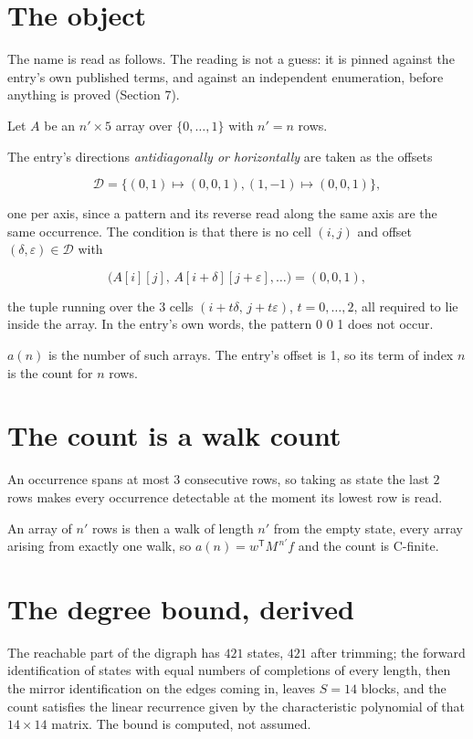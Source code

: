 \documentclass[11pt]{article}
\theoremstyle{definition}
\begin{document}
\section{The object}

The name is read as follows. The reading is not a guess: it is pinned against the entry's own published terms, and against an independent enumeration, before anything is proved (Section 7).

Let $A$ be an $n' \times 5$ array over $\{0,\dots,1\}$ with $n' = n$ rows.

The entry's directions {\itshape antidiagonally or horizontally} are taken as the offsets

\[\mathcal{D} = \{(0,1)\mapsto(0,0,1), (1,-1)\mapsto(0,0,1)\},\]

one per axis, since a pattern and its reverse read along the same axis are the same occurrence. The condition is that there is no cell $(i,j)$ and offset $(\delta,\varepsilon)\in\mathcal{D}$ with

\[\bigl(A[i][j],\,A[i{+}\delta][j{+}\varepsilon],\dots\bigr) = (0, 0, 1),\]

the tuple running over the $3$ cells $(i+t\delta,\,j+t\varepsilon)$, $t = 0,\dots,2$, all required to lie inside the array. In the entry's own words, the pattern 0 0 1 does not occur.

$a(n)$ is the number of such arrays. The entry's offset is 1, so its term of index $n$ is the count for $n$ rows.

\section{The count is a walk count}

An occurrence spans at most $3$ consecutive rows, so taking as state the last $2$ rows makes every occurrence detectable at the moment its lowest row is read.

An array of $n'$ rows is then a walk of length $n'$ from the empty state, every array arising from exactly one walk, so $a(n) = w^{\mathsf T}M^{\,n'}f$ and the count is C-finite.

\section{The degree bound, derived}

The reachable part of the digraph has $421$ states, $421$ after trimming; the forward identification of states with equal numbers of completions of every length, then the mirror identification on the edges coming in, leaves $S = 14$ blocks, and the count satisfies the linear recurrence given by the characteristic polynomial of that $14\times14$ matrix. The bound is computed, not assumed.
\end{document}
